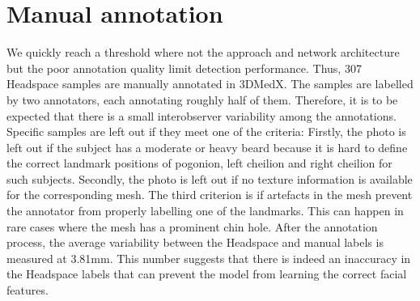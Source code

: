 \documentclass[class=article, crop=false]{standalone}
\begin{document}

\section{Manual annotation}
\label{sec:app_manual_annotation}
We quickly reach a threshold where not the approach and network architecture but the poor annotation quality limit detection performance. Thus, 307 Headspace samples are manually annotated in 3DMedX. The samples are labelled by two annotators, each annotating roughly half of them. Therefore, it is to be expected that there is a small interobserver variability among the annotations. Specific samples are left out if they meet one of the criteria: Firstly, the photo is left out if the subject has a moderate or heavy beard because it is hard to define the correct landmark positions of pogonion, left cheilion and right cheilion for such subjects. Secondly, the photo is left out if no texture information is available for the corresponding mesh. The third criterion is if artefacts in the mesh prevent the annotator from properly labelling one of the landmarks. This can happen in rare cases where the mesh has a prominent chin hole.
After the annotation process, the average variability between the Headspace and manual labels is measured at 3.81mm. This number suggests that there is indeed an inaccuracy in the Headspace labels that can prevent the model from learning the correct facial features.
\end{document}
